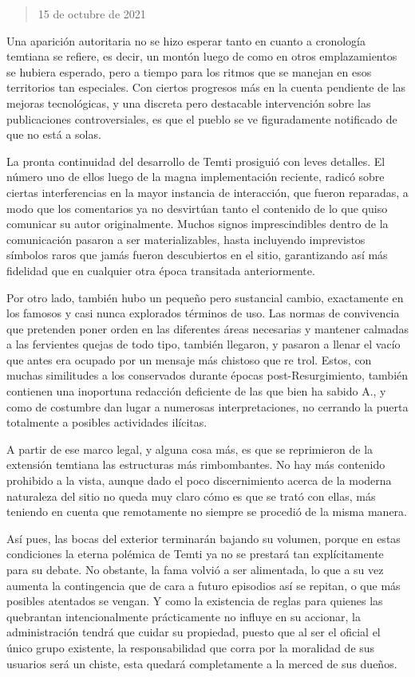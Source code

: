 \documentclass[
  spanish,
]{book}
\begin{document}
\begin{quote}
15 de octubre de 2021
\end{quote}

Una aparición autoritaria no se hizo esperar tanto en cuanto a cronología temtiana se refiere, es decir, un montón luego de como en otros emplazamientos se hubiera esperado, pero a tiempo para los ritmos que se manejan en esos territorios tan especiales. Con ciertos progresos más en la cuenta pendiente de las mejoras tecnológicas, y una discreta pero destacable intervención sobre las publicaciones controversiales, es que el pueblo se ve figuradamente notificado de que no está a solas.

La pronta continuidad del desarrollo de Temti prosiguió con leves detalles. El número uno de ellos luego de la magna implementación reciente, radicó sobre ciertas interferencias en la mayor instancia de interacción, que fueron reparadas, a modo que los comentarios ya no desvirtúan tanto el contenido de lo que quiso comunicar su autor originalmente. Muchos signos imprescindibles dentro de la comunicación pasaron a ser materializables, hasta incluyendo imprevistos símbolos raros que jamás fueron descubiertos en el sitio, garantizando así más fidelidad que en cualquier otra época transitada anteriormente.

Por otro lado, también hubo un pequeño pero sustancial cambio, exactamente en los famosos y casi nunca explorados términos de uso. Las normas de convivencia que pretenden poner orden en las diferentes áreas necesarias y mantener calmadas a las fervientes quejas de todo tipo, también llegaron, y pasaron a llenar el vacío que antes era ocupado por un mensaje más chistoso que re trol. Estos, con muchas similitudes a los conservados durante épocas post-Resurgimiento, también contienen una inoportuna redacción deficiente de las que bien ha sabido A., y como de costumbre dan lugar a numerosas interpretaciones, no cerrando la puerta totalmente a posibles actividades ilícitas.

A partir de ese marco legal, y alguna cosa más, es que se reprimieron de la extensión temtiana las estructuras más rimbombantes. No hay más contenido prohibido a la vista, aunque dado el poco discernimiento acerca de la moderna naturaleza del sitio no queda muy claro cómo es que se trató con ellas, más teniendo en cuenta que remotamente no siempre se procedió de la misma manera.

Así pues, las bocas del exterior terminarán bajando su volumen, porque en estas condiciones la eterna polémica de Temti ya no se prestará tan explícitamente para su debate. No obstante, la fama volvió a ser alimentada, lo que a su vez aumenta la contingencia que de cara a futuro episodios así se repitan, o que más posibles atentados se vengan. Y como la existencia de reglas para quienes las quebrantan intencionalmente prácticamente no influye en su accionar, la administración tendrá que cuidar su propiedad, puesto que al ser el oficial el único grupo existente, la responsabilidad que corra por la moralidad de sus usuarios será un chiste, esta quedará completamente a la merced de sus dueños.
\end{document}
